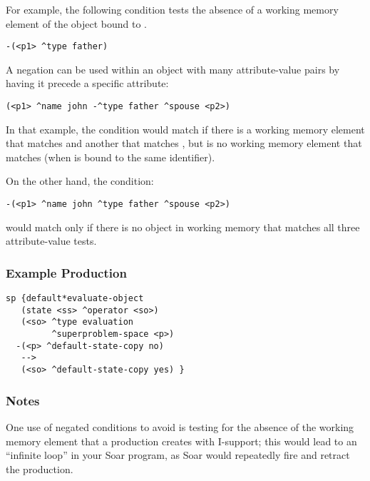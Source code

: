 For example, the following condition tests the absence of a working memory
element of the object bound to .

\begin{verbatim}
-(<p1> ^type father)
\end{verbatim} \vspace{12pt}

A negation can be used within an object with many attribute-value pairs by
having it precede a specific attribute:

\begin{verbatim}
(<p1> ^name john -^type father ^spouse <p2>)
\end{verbatim} \vspace{12pt}

In that example, the condition would match if there is a working memory
element that matches  and another that matches 
, but is no working memory element that matches 
 (when  is bound to the same 
identifier).

On the other hand, the condition:
\begin{verbatim}
-(<p1> ^name john ^type father ^spouse <p2>)
\end{verbatim}

would match only if there is no object in working memory that matches all
three attribute-value tests.

\subsubsection*{Example Production}
\begin{verbatim}
sp {default*evaluate-object
   (state <ss> ^operator <so>)
   (<so> ^type evaluation 
         ^superproblem-space <p>)
  -(<p> ^default-state-copy no)
   -->
   (<so> ^default-state-copy yes) }
\end{verbatim}

\subsubsection*{Notes}

One use of negated conditions to avoid is testing for the absence of the
working memory element that a production creates with I-support; this
would lead to an ``infinite loop'' in your Soar program, as Soar would
repeatedly fire and retract the production.


